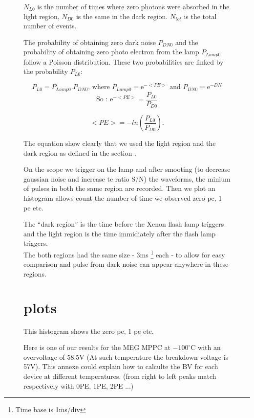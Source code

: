 \documentclass[a4paper, 11pt]{report}%
\newcommand{\xfl}{Xenon flash lamp }
\begin{document}
\begin{figure}[!hbtp]
  \(N_{L0}\) is the number of times where zero photons were absorbed in the light region, \(N_{D0}\) is the same in the dark region. 
  \(N_{tot}\) is the total number of events. 
  
  The probability of obtaining zero dark noise \(P_{DN0}\) and the probability of obtaining zero photo electron from the lamp \(P_{Lamp0}\)
  follow a Poisson distribution. These two probabilities are linked by the probability \(P_{L0}\): 
  
  \begin{equation}
    P_{L0} = P_{Lamp0}.P_{DN0} \textrm{, where } P_{Lamp0} = \mathrm{e}^{-<PE>} \textrm{ and } P_{DN0} = \mathrm{e}^{-DN}
  \end{equation}
  \begin{equation}
    \textrm{So : } \mathrm{e}^{-<PE>} =\frac{P_{L0}}{P_{D0}}
  \end{equation}
  
  \begin{equation}
    <PE> =  -ln(\frac{P_{L0}}{P_{D0}}).
  \end{equation}
  
  The equation show clearly that we used the light region and the dark region as defined in the section . 
  
  On the scope we trigger on the lamp and after smooting (to decrease gaussian noise and increase te ratio S/N) the waveforms, the minium 
  of pulses in both the same region are recorded. Then we plot an histogram allows count the number of time we observed zero pe, 1 pe etc. 
    
  The ``dark region'' is the time before the \xfl triggers 
  and the light region is the time immidiately after the flash lamp triggers. 
  \\
  The both regions had the same size - 3ms \footnote{Time base is 1ms/div} each - to allow for easy comparison and pulse from 
  dark noise  can appear anywhere in these regions. 
  
  \section{plots}
  
  This histogram shows the zero pe, 1 pe etc. 
  
  Here is one of our results for the MEG MPPC at $-100^\circ$C with an overvoltage of 58.5V (At such temperature the breakdown voltage 
  is 57V). This annexe could explain how to calculte the BV for each device at different temperatures. 
  (from right to left peaks match respectively with 0PE, 1PE, 2PE ...)  
  

\end{figure}
\end{document}
